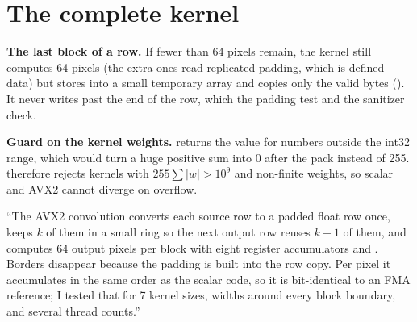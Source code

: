\section{The complete kernel}



\begin{plain}
\textbf{The last block of a row.} If fewer than 64 pixels remain, the kernel still computes 64 pixels (the extra ones read replicated padding, which is defined data) but stores into a small temporary array and copies only the valid bytes (). It never writes past the end of the row, which the padding test and the sanitizer check.

\textbf{Guard on the kernel weights.}  returns the value  for numbers outside the int32 range, which would turn a huge positive sum into 0 after the pack instead of 255.  therefore rejects kernels with $255\sum|w|>10^9$ and non-finite weights, so scalar and AVX2 cannot diverge on overflow.
\end{plain}

\begin{sound}
``The AVX2 convolution converts each source row to a padded float row once, keeps $k$ of them in a small ring so the next output row reuses $k-1$ of them, and computes 64 output pixels per block with eight register accumulators and . Borders disappear because the padding is built into the row copy. Per pixel it accumulates in the same order as the scalar code, so it is bit-identical to an FMA reference; I tested that for 7 kernel sizes, widths around every block boundary, and several thread counts.''
\end{sound}
